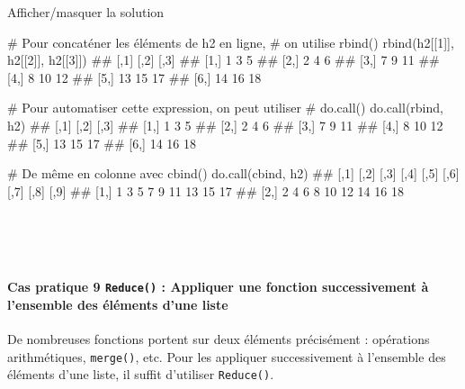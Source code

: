 \documentclass[12pt,]{article}
\newenvironment{Shaded}{}{}
\newcommand{\KeywordTok}[1]{\textcolor[rgb]{0.00,0.00,1.00}{{#1}}}
\newcommand{\DecValTok}[1]{{#1}}
\newcommand{\CommentTok}[1]{\textcolor[rgb]{0.00,0.50,0.00}{{#1}}}
\newcommand{\NormalTok}[1]{{#1}}
\let\oldparagraph\paragraph
\renewcommand{\paragraph}[1]{\oldparagraph{#1}\mbox{}}
\begin{document}
\begin{enumerate}
  Afficher/masquer la solution

  \hypertarget{sol31}{}
\begin{Shaded}
\begin{Highlighting}[]
\CommentTok{# Pour concaténer les éléments de h2 en ligne, }
\CommentTok{# on utilise rbind()}
\KeywordTok{rbind}\NormalTok{(h2[[}\DecValTok{1}\NormalTok{]], h2[[}\DecValTok{2}\NormalTok{]], h2[[}\DecValTok{3}\NormalTok{]])}
\NormalTok{##      [,1] [,2] [,3]}
\NormalTok{## [1,]    1    3    5}
\NormalTok{## [2,]    2    4    6}
\NormalTok{## [3,]    7    9   11}
\NormalTok{## [4,]    8   10   12}
\NormalTok{## [5,]   13   15   17}
\NormalTok{## [6,]   14   16   18}

\CommentTok{# Pour automatiser cette expression, on peut utiliser}
\CommentTok{# do.call()}
\KeywordTok{do.call}\NormalTok{(rbind, h2)}
\NormalTok{##      [,1] [,2] [,3]}
\NormalTok{## [1,]    1    3    5}
\NormalTok{## [2,]    2    4    6}
\NormalTok{## [3,]    7    9   11}
\NormalTok{## [4,]    8   10   12}
\NormalTok{## [5,]   13   15   17}
\NormalTok{## [6,]   14   16   18}

\CommentTok{# De même en colonne avec cbind()}
\KeywordTok{do.call}\NormalTok{(cbind, h2)}
\NormalTok{##      [,1] [,2] [,3] [,4] [,5] [,6] [,7] [,8] [,9]}
\NormalTok{## [1,]    1    3    5    7    9   11   13   15   17}
\NormalTok{## [2,]    2    4    6    8   10   12   14   16   18}
\end{Highlighting}
\end{Shaded}

  ~
\end{enumerate}

~

\paragraph{\texorpdfstring{\textbf{Cas pratique 9} \texttt{Reduce()} :
Appliquer une fonction successivement à l'ensemble des éléments d'une
liste}{Cas pratique 9 Reduce() : Appliquer une fonction successivement à l'ensemble des éléments d'une liste}}\label{cas-pratique-9-reduce-appliquer-une-fonction-successivement-a-lensemble-des-elements-dune-liste}

De nombreuses fonctions portent sur deux éléments précisément :
opérations arithmétiques, \texttt{merge()}, etc. Pour les appliquer
successivement à l'ensemble des éléments d'une liste, il suffit
d'utiliser \texttt{Reduce()}.
\end{document}
